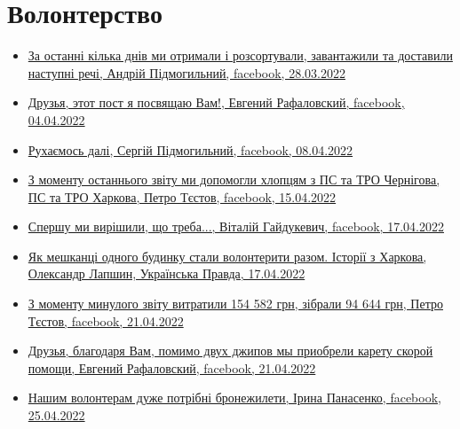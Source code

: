  
 
 
 
 

\section{Волонтерство}
\label{sec:topics.vojna.volonter}

\begin{itemize} %

\item \hyperlink{28_03_2022.fb.pidmogylnyj_andrij.kiev.terra_incognita.1.rechi}{%
За останні кілька днів ми отримали і розсортували, завантажили та доставили наступні речі, %
Андрій Підмогильний, facebook, 28.03.2022%
}

\item \hyperlink{04_04_2022.fb.rafalovskij_evgenij.kiev.1.druzja_post}{%
Друзья, этот пост я посвящаю Вам!, Евгений Рафаловский, facebook, %
04.04.2022%
}

\item \hyperlink{08_04_2022.fb.pidmogylnyj_sergij.1.ruhaemos_dali}{%
Рухаємось далі, Сергій Підмогильний, facebook, 08.04.2022%
}

\item \hyperlink{15_04_2022.fb.testov_petro.kiev.1.zvit_chernigov_harkov}{%
З моменту останнього звіту ми допомогли хлопцям з ПС та ТРО Чернігова, ПС та ТРО Харкова, %
Петро Тєстов, facebook, 15.04.2022%
}

\item \hyperlink{17_04_2022.fb.gajdukevich_vitalij.1.spershu_my_vyrishyly}{%
Спершу ми вирішили, що треба..., Віталій Гайдукевич, facebook, 17.04.2022%
}

\item \hyperlink{17_04_2022.stz.news.ua.pravda.2.budynok_volontery_istorii_harkov}{%
Як мешканці одного будинку стали волонтерити разом. Історії з Харкова, Олександр Лапшин, Українська Правда, %
17.04.2022%
}

\item \hyperlink{21_04_2022.fb.testov_petro.kiev.1.zvit}{%
З моменту минулого звіту витратили 154 582 грн, зібрали 94 644 грн, Петро Тєстов, facebook, 21.04.2022%
}

\item \hyperlink{21_04_2022.fb.rafalovskij_evgenij.kiev.1.kareta_skoroj_pomoschi}{%
Друзья, благодаря Вам, помимо двух джипов мы приобрели карету скорой помощи, Евгений Рафаловский, facebook, %
21.04.2022%
}

\item \hyperlink{25_04_2022.fb.panasenko_iryna.harkiv.1.volontery_broniki}{%
Нашим волонтерам дуже потрібні бронежилети, Ірина Панасенко, facebook, 25.04.2022%
}

\end{itemize} %
